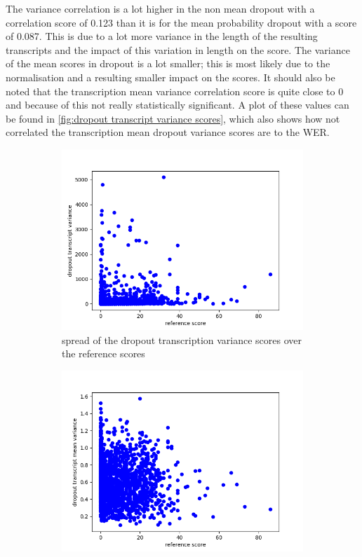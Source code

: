     
The variance correlation is a lot higher in the non mean dropout with a correlation score of 0.123 than it is for the mean probability dropout with a score of 0.087. This is due to a lot more variance in the length of the resulting transcripts and the impact of this variation in length on the score. The variance of the mean scores in dropout is a lot smaller; this is most likely due to the normalisation and a resulting smaller impact on the scores. It should also be noted that the transcription mean variance correlation score is quite close to 0 and because of this not really statistically significant. A plot of these values can be found in \autoref{fig:dropout transcript variance scores}, which also shows how not correlated the transcription mean dropout variance scores are to the WER. 
    \begin{figure}
        \centering%
    \begin{subfigure}{0.4\linewidth}
        \includegraphics[width=\textwidth]{Latex/sections/images/seamlessdropouttranscriptvar.png}
        \caption{spread of the dropout transcription variance scores over the reference scores}
    \end{subfigure}
    \begin{subfigure}{0.4\linewidth}
        \includegraphics[width=\textwidth]{Latex/sections/images/seamlessdropouttranscriptmeanvar.png}

\end{subfigure}
\end{figure}

